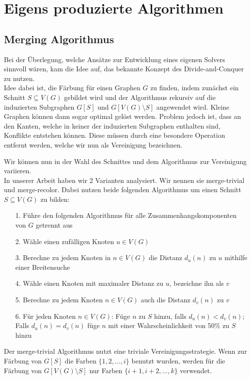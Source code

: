 \documentclass[11pt]{article}
\begin{document}
\section{Eigens produzierte Algorithmen} %

\subsection{Merging Algorithmus}
Bei der Überlegung, welche Ansätze zur Entwicklung eines eigenen Solvers sinnvoll wären,
kam die Idee auf, das bekannte Konzept des Divide-and-Conquer zu nutzen.\\
Idee dabei ist, die Färbung für einen Graphen $G$ zu finden, 
indem zunächst ein Schnitt $S\subseteq V(G)$ gebildet wird 
und der Algorithmus rekursiv auf die induzierten Subgraphen 
$G[S]$ und $G[V(G)\setminus S]$ angewendet wird.
Kleine Graphen können dann sogar optimal gelöst werden. 
Problem jedoch ist, dass an den Kanten, 
welche in keiner der induzierten Subgraphen enthalten sind,
Konflikte entstehen können. Diese müssen durch eine besondere Operation entfernt werden, 
welche wir nun als Vereinigung bezeichnen.\par

Wir können nun in der Wahl des Schnittes und dem Algorithmus zur Vereinigung variieren.\\
In unserer Arbeit haben wir 2 Varianten analysiert. Wir nennen sie merge-trivial und merge-recolor.
Dabei nutzen beide folgenden Algorithmus um einen Schnitt $S\subseteq V(G)$ zu bilden:
\begin{itemize}
\item[1.] Führe den folgenden Algorithmus für alle Zusammenhangskomponenten von $G$ getrennt aus
\item[2.] Wähle einen zufälligen Knoten $u\in V(G)$
\item[3.] Berechne zu jedem Knoten in $n\in V(G)$ die Distanz $d_u(n)$ zu $u$ mithilfe einer Breitensuche
\item[4.] Wähle einen Knoten mit maximaler Distanz zu $u$, bezeichne ihn als $v$
\item[5.] Berechne zu jedem Knoten $n\in V(G)$ auch die Distanz $d_v(n)$ zu $v$
\item[6.] Für jeden Knoten $n\in V(G)$: Füge $n$ zu $S$ hinzu, falls $d_u(n)<d_v(n)$; Falls $d_u(n)=d_v(n)$ füge $n$ mit einer Wahrscheinlichkeit von 50\% zu $S$ hinzu
\end{itemize}

Der merge-trivial Algorithmus nutzt eine triviale Vereinigungsstrategie.
Wenn zur Färbung von $G[S]$ die Farben $\{1,2,...,i\}$ benutzt wurden, 
werden für die Färbung von $G[V(G)\setminus S]$ nur Farben $\{i+1,i+2,...,k\}$ verwendet.\\
\end{document}
